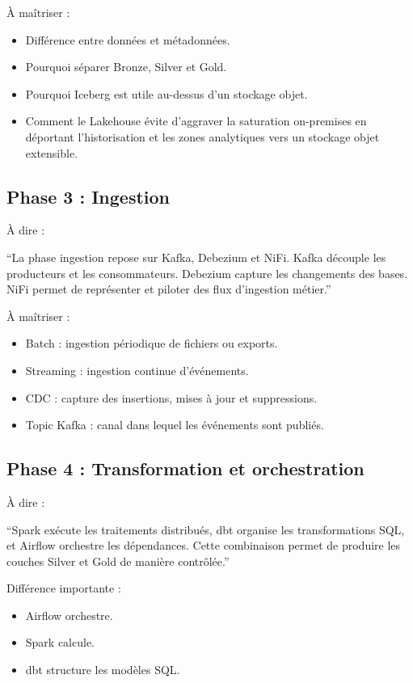 \documentclass[11pt,a4paper]{article}
\newcommand{\important}[1]{%
  \vspace{0.25cm}
  \noindent
  \colorbox{softblue}{%
    \parbox{\dimexpr\textwidth-2\fboxsep\relax}{#1}%
  }
  \vspace{0.2cm}
}
\begin{document}
À maîtriser :
\begin{itemize}
  \item Différence entre données et métadonnées.
  \item Pourquoi séparer Bronze, Silver et Gold.
  \item Pourquoi Iceberg est utile au-dessus d'un stockage objet.
  \item Comment le Lakehouse évite d'aggraver la saturation on-premises en déportant l'historisation et les zones analytiques vers un stockage objet extensible.
\end{itemize}

\subsection{Phase 3 : Ingestion}

À dire :

\important{
``La phase ingestion repose sur Kafka, Debezium et NiFi. Kafka découple les producteurs et les consommateurs. Debezium capture les changements des bases. NiFi permet de représenter et piloter des flux d'ingestion métier.''
}

À maîtriser :
\begin{itemize}
  \item Batch : ingestion périodique de fichiers ou exports.
  \item Streaming : ingestion continue d'événements.
  \item CDC : capture des insertions, mises à jour et suppressions.
  \item Topic Kafka : canal dans lequel les événements sont publiés.
\end{itemize}

\subsection{Phase 4 : Transformation et orchestration}

À dire :

\important{
``Spark exécute les traitements distribués, dbt organise les transformations SQL, et Airflow orchestre les dépendances. Cette combinaison permet de produire les couches Silver et Gold de manière contrôlée.''
}

Différence importante :
\begin{itemize}
  \item Airflow orchestre.
  \item Spark calcule.
  \item dbt structure les modèles SQL.
\end{itemize}
\end{document}

